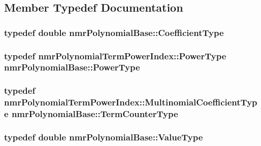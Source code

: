 \subsection{Member Typedef Documentation}
\hypertarget{classnmr_polynomial_base_a8693efdfc8585ccb49abea69f74f3eef}{}
\subsubsection[{Coefficient\+Type}]{\setlength{\rightskip}{0pt plus 5cm}typedef double {\bf nmr\+Polynomial\+Base\+::\+Coefficient\+Type}}\label{classnmr_polynomial_base_a8693efdfc8585ccb49abea69f74f3eef}
\hypertarget{classnmr_polynomial_base_a58607c884bf2e6725a77ed4d9e14ba26}{}
\subsubsection[{Power\+Type}]{\setlength{\rightskip}{0pt plus 5cm}typedef {\bf nmr\+Polynomial\+Term\+Power\+Index\+::\+Power\+Type} {\bf nmr\+Polynomial\+Base\+::\+Power\+Type}}\label{classnmr_polynomial_base_a58607c884bf2e6725a77ed4d9e14ba26}
\hypertarget{classnmr_polynomial_base_a4b0abd66b12b6f5bfb30d0eb1607e661}{}
\subsubsection[{Term\+Counter\+Type}]{\setlength{\rightskip}{0pt plus 5cm}typedef {\bf nmr\+Polynomial\+Term\+Power\+Index\+::\+Multinomial\+Coefficient\+Type} {\bf nmr\+Polynomial\+Base\+::\+Term\+Counter\+Type}}\label{classnmr_polynomial_base_a4b0abd66b12b6f5bfb30d0eb1607e661}
\hypertarget{classnmr_polynomial_base_a72f0bc16b225e4708bcf15a77ba206e3}{}
\subsubsection[{Value\+Type}]{\setlength{\rightskip}{0pt plus 5cm}typedef double {\bf nmr\+Polynomial\+Base\+::\+Value\+Type}}\label{classnmr_polynomial_base_a72f0bc16b225e4708bcf15a77ba206e3}
\hypertarget{classnmr_polynomial_base_aae95477e451ddc7d3ee3f41cbdaadde2}{}
